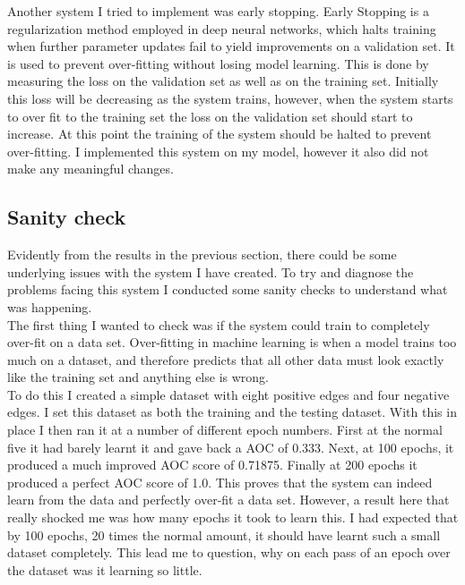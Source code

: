 \documentclass{l4proj}
\begin{document}
Another system I tried to implement was early stopping. Early Stopping is a regularization method employed in deep neural networks, which halts training when further parameter updates fail to yield improvements on a validation set. It is used to prevent over-fitting without losing model learning. This is done by measuring the loss on the validation set as well as on the training set. Initially this loss will be decreasing as the system trains, however, when the system starts to over fit to the training set the loss on the validation set should start to increase. At this point the training of the system should be halted to prevent over-fitting. I implemented this system on my model, however it also did not make any meaningful changes. \\
\subsection{Sanity check}

Evidently from the results in the previous section, there could be some underlying issues with the system I have created. To try and diagnose the problems facing this system I conducted some sanity checks to understand what was happening. \\

The first thing I wanted to check was if the system could train to completely over-fit on a data set. Over-fitting in machine learning is when a model trains too much on a dataset, and therefore predicts that all other data must look exactly like the training set and anything else is wrong. \\

To do this I created a simple dataset with eight positive edges and four negative edges. I set this dataset as both the training and the testing dataset. With this in place I then ran it at a number of different epoch numbers. First at the normal five it had barely learnt it and gave back a AOC of 0.333. Next, at 100 epochs, it produced a much improved AOC score of 0.71875. Finally at 200 epochs it produced a perfect AOC score of 1.0. This proves that the system can indeed learn from the data and perfectly over-fit a data set. However, a result here that really shocked me was how many epochs it took to learn this. I had expected that by 100 epochs, 20 times the normal amount, it should have learnt such a small dataset completely. This lead me to question, why on each pass of an epoch over the dataset was it learning so little. \\
\end{document}
